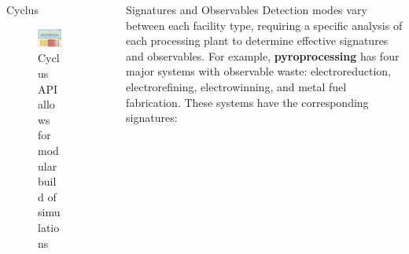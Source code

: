 \documentclass[final]{beamer}
\newlength{\sepwid}
\newlength{\onecolwid}
\newlength{\threecolwid}
\begin{document}
\begin{frame}[t]
\begin{columns}[t,totalwidth=\threecolwid]
\begin{column}{\onecolwid}
\begin{block}{Cyclus}

\begin{figure}
	\includegraphics[width=0.9\linewidth]{Cyclus_graph}
	\caption{Cyclus API allows for modular build of simulations \cite{huff_2018}}
\end{figure}

\end{block}

\end{column} %

\begin{column}{\sepwid}\end{column} %



\begin{column}{\onecolwid} %

\begin{block}{Signatures and Observables}
        Detection modes vary between each facility type, requiring a specific 
        analysis of each processing plant to determine effective signatures and 
        observables. For example, \textbf{pyroprocessing} has four major 
        systems with observable waste: electroreduction, electrorefining, electrowinning, and metal fuel fabrication\cite{Borrelli_2017}.
        These systems have the corresponding signatures:
        

\end{block}
\end{column}
\end{columns}
\end{frame}
\end{document}
